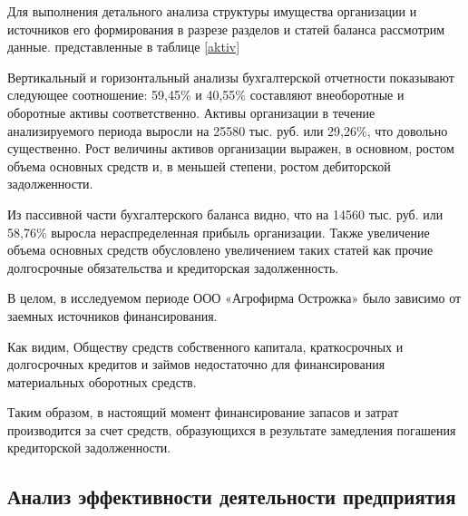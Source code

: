 Для выполнения детального анализа структуры имущества организации и источников его формирования в разрезе разделов и статей баланса рассмотрим данные. представленные в таблице \ref{aktiv}


Вертикальный и горизонтальный анализы бухгалтерской отчетности показывают следующее соотношение: 59,45\% и 40,55\% составляют внеоборотные и оборотные активы соответственно. Активы организации в течение анализируемого периода выросли на 25580 тыс. руб. или 29,26\%, что довольно существенно. Рост величины активов организации выражен, в основном, ростом объема основных средств и, в меньшей степени, ростом дебиторской задолженности. 

Из пассивной части бухгалтерского баланса видно, что на 14560 тыс. руб. или 58,76\% выросла нераспределенная прибыль организации. Также увеличение объема основных средств обусловлено увеличением таких статей как прочие долгосрочные обязательства и кредиторская задолженность.

В целом, в исследуемом периоде ООО «Агрофирма Острожка»  было зависимо от заемных источников финансирования.

Как видим, Обществу средств собственного капитала, краткосрочных и долгосрочных кредитов и займов недостаточно для финансирования материальных оборотных средств.

Таким образом, в настоящий момент финансирование запасов и затрат производится за счет средств, образующихся в результате замедления погашения кредиторской задолженности.

\subsection{Анализ эффективности деятельности предприятия}


